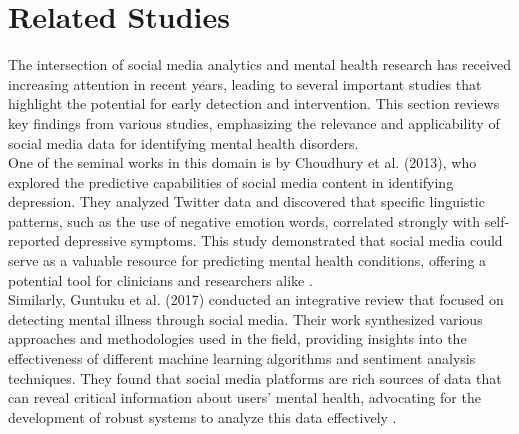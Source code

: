 
\section{Related Studies}

\noindent
The intersection of social media analytics and mental health research has received increasing attention in recent years, leading to several important studies that highlight the potential for early detection and intervention. This section reviews key findings from various studies, emphasizing the relevance and applicability of social media data for identifying mental health disorders. \\

\noindent
One of the seminal works in this domain is by Choudhury et al. (2013), who explored the predictive capabilities of social media content in identifying depression. They analyzed Twitter data and discovered that specific linguistic patterns, such as the use of negative emotion words, correlated strongly with self-reported depressive symptoms. This study demonstrated that social media could serve as a valuable resource for predicting mental health conditions, offering a potential tool for clinicians and researchers alike \cite{Choudhury2013PredictingDV}. \\

\noindent
Similarly, Guntuku et al. (2017) conducted an integrative review that focused on detecting mental illness through social media. Their work synthesized various approaches and methodologies used in the field, providing insights into the effectiveness of different machine learning algorithms and sentiment analysis techniques. They found that social media platforms are rich sources of data that can reveal critical information about users' mental health, advocating for the development of robust systems to analyze this data effectively \cite{Guntuku2017DetectingDA}. \\

